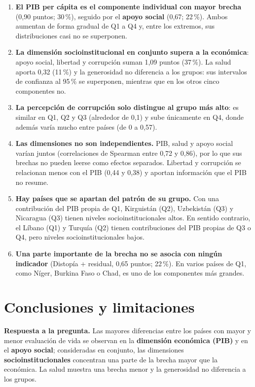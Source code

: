 \documentclass[11pt,a4paper]{article}
\begin{document}
\begin{enumerate}
\item \textbf{El PIB per cápita es el componente individual con mayor brecha} (0,90 puntos; 30\,\%), seguido
  por el \textbf{apoyo social} (0,67; 22\,\%). Ambos aumentan de forma gradual de Q1 a Q4 y, entre los extremos,
  sus distribuciones casi no se superponen.
\item \textbf{La dimensión socioinstitucional en conjunto supera a la económica}: apoyo social, libertad y
  corrupción suman 1,09 puntos (37\,\%). La salud aporta 0,32 (11\,\%) y la generosidad no diferencia a los
  grupos: sus intervalos de confianza al 95\,\% se superponen, mientras que en los otros cinco componentes no.
\item \textbf{La percepción de corrupción solo distingue al grupo más alto}: es similar en Q1, Q2 y Q3
  (alrededor de 0,1) y sube únicamente en Q4, donde además varía mucho entre países (de 0 a 0,57).
\item \textbf{Las dimensiones no son independientes.} PIB, salud y apoyo social varían juntos (correlaciones de
  Spearman entre 0,72 y 0,86), por lo que sus brechas no pueden leerse como efectos separados. Libertad y
  corrupción se relacionan menos con el PIB (0,44 y 0,38) y aportan información que el PIB no resume.
\item \textbf{Hay países que se apartan del patrón de su grupo.} Con una contribución del PIB propia de Q1,
  Kirguistán (Q2), Uzbekistán (Q3) y Nicaragua (Q3) tienen niveles socioinstitucionales altos. En sentido
  contrario, el Líbano (Q1) y Turquía (Q2) tienen contribuciones del PIB propias de Q3 o Q4, pero niveles
  socioinstitucionales bajos.
\item \textbf{Una parte importante de la brecha no se asocia con ningún indicador} (Distopía + residual, 0,65
  puntos; 22\,\%). En varios países de Q1, como Níger, Burkina Faso o Chad, es uno de los componentes más grandes.
\end{enumerate}

\section{Conclusiones y limitaciones}

\textbf{Respuesta a la pregunta.} Las mayores diferencias entre los países con mayor y menor evaluación de vida
se observan en la \textbf{dimensión económica (PIB)} y en el \textbf{apoyo social}; consideradas en conjunto, las
dimensiones \textbf{socioinstitucionales} concentran una parte de la brecha mayor que la económica. La salud
muestra una brecha menor y la generosidad no diferencia a los grupos.
\end{document}
